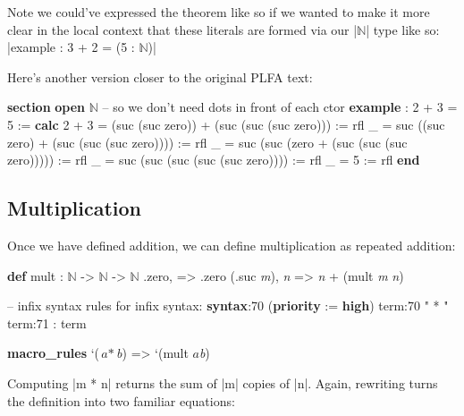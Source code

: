 \documentclass{memoir}
\newcommand{\coloredwave}[2]{\textcolor{#1}{\uwave{\textcolor{black}{#2}}}}
\newcommand{\warningDecorate}[1]{\coloredwave{warningColor}{#1}}
\newcommand{\PLFANat}{\ensuremath{\mathbb{N}}}
\newcommand{\PLFAComment}[1]{\textcolor{codecomment}{#1}}
\begin{document}
\par
Note we could've expressed the theorem like so if we wanted to
make it more clear in the local context that these literals are formed via our
\LeanVerb|\PLFANat{}| type like so: \LeanVerb|example : 3 + 2 = (5 : \PLFANat{})|

\par
Here's another version closer to the original PLFA text:

\par
\begin{LeanVerbatim}
\textbf{section}
\textbf{open} \PLFANat{}  \PLFAComment{-- so we don't need dots in front of each ctor}
\textbf{example} : 2 + 3 = 5 :=
  \textbf{calc}
      2 + 3
      = (suc (suc zero)) + (suc (suc (suc zero)))   := rfl
      _ = suc ((suc zero) + (suc (suc (suc zero)))) := rfl
      _ = suc (suc (zero + (suc (suc (suc zero))))) := rfl
      _ = suc (suc (suc (suc (suc zero))))          := rfl
      _ = 5                                         := rfl
\textbf{end}
\end{LeanVerbatim}

\par

\subsection{Multiplication}\label{PLFA--in--Lean----Part--1----Naturals----Multiplication}

\par
Once we have defined addition, we can define multiplication as repeated
addition:

\par
\begin{LeanVerbatim}
\textbf{def} mult : \PLFANat{} -> \PLFANat{} -> \PLFANat{}
     .zero, \warningDecorate{\textit{n}}      => .zero
     (.suc \textit{m}), \textit{n}   => \textit{n} + (mult \textit{m} \textit{n})

\PLFAComment{-- infix syntax rules for infix syntax:}
\textbf{syntax}:70 (\textbf{priority} := \textbf{high}) term:70 " * " term:71 : term

\textbf{macro_rules}
   `($\textit{a} * $\textit{b}) => `(mult $\textit{a} $\textit{b})
\end{LeanVerbatim}

\par
\par\noindent Computing \LeanVerb|m * n| returns the sum of \LeanVerb|m| copies of \LeanVerb|n|. Again, rewriting turns
the definition into two familiar equations:
\end{document}
